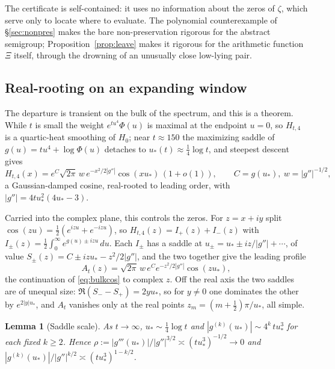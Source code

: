 \documentclass[11pt,reqno]{amsart}
\theoremstyle{plain}
\newtheorem{lemma}[theorem]{Lemma}
\theoremstyle{definition}
\theoremstyle{remark}
\begin{document}
The certificate is self-contained: it uses no information about the zeros of
$\zeta$, which serve only to locate where to evaluate. The polynomial counterexample of
\S\ref{sec:nonpres} makes the bare non-preservation rigorous for the abstract
semigroup; Proposition~\ref{prop:leave} makes it rigorous for the arithmetic
function $\Xi$ itself, through the drowning of an unusually close low-lying pair.

\subsection{Real-rooting on an expanding window}
The departure is transient on the bulk of the spectrum, and this is a theorem.
While $t$ is small the weight $e^{tu^4}\Phi(u)$ is maximal at the endpoint $u=0$,
so $H_{t,4}$ is a quartic-heat smoothing of $H_0$; near $t\approx150$ the
maximizing saddle of $g(u)=tu^4+\log\Phi(u)$ detaches to
$u_*(t)\approx\tfrac14\log t$, and steepest descent gives
\begin{equation}\label{eq:bulkcos}
   H_{t,4}(x)=e^{C}\sqrt{2\pi}\,w\,e^{-x^2/2|g''|}\cos(xu_*)\,(1+o(1)),
   \qquad C=g(u_*),\ w=|g''|^{-1/2},
\end{equation}
a Gaussian-damped cosine, real-rooted to leading order, with $|g''|=4tu_*^2(4u_*-3)$.

Carried into the complex plane, this controls the zeros. For $z=x+iy$ split
$\cos(zu)=\tfrac12(e^{izu}+e^{-izu})$, so $H_{t,4}(z)=I_+(z)+I_-(z)$ with
$I_\pm(z)=\tfrac12\int_0^\infty e^{g(u)\pm izu}\,du$. Each $I_\pm$ has a saddle at
$u_\pm=u_*\pm iz/|g''|+\cdots$, of value $S_\pm(z)=C\pm izu_*-z^2/2|g''|$, and the
two together give the leading profile
\begin{equation}\label{eq:Acomplex}
   A_t(z)=\sqrt{2\pi}\,w\,e^{C}e^{-z^2/2|g''|}\cos(zu_*),
\end{equation}
the continuation of \eqref{eq:bulkcos} to complex $z$. Off the real axis the two
saddles are of unequal size: $\Re(S_--S_+)=2yu_*$, so for $y\neq0$ one dominates
the other by $e^{2|y|u_*}$, and $A_t$ vanishes only at the real points
$z_m=(m+\tfrac12)\pi/u_*$, all simple.

\begin{lemma}[Saddle scale]\label{lem:scale}
As $t\to\infty$, $u_*\sim\tfrac14\log t$ and $|g^{(k)}(u_*)|\sim 4^k\,tu_*^3$ for
each fixed $k\ge2$. Hence $\rho:=|g'''(u_*)|/|g''|^{3/2}\asymp(tu_*^3)^{-1/2}\to0$
and $|g^{(k)}(u_*)|/|g''|^{k/2}\asymp(tu_*^3)^{1-k/2}$.
\end{lemma}
\end{document}
